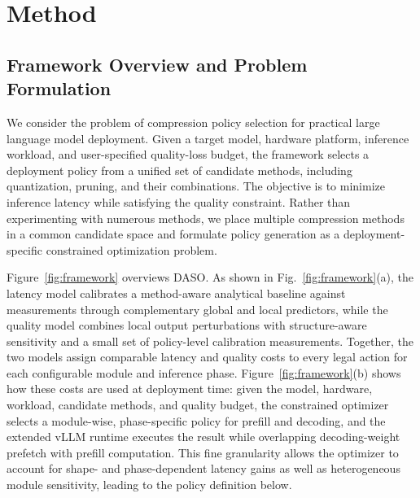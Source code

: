 \documentclass[letterpaper]{article} %
\begin{document}



\section{Method}
\subsection{Framework Overview and Problem Formulation}

We consider the problem of compression policy selection for practical large language model deployment. Given a target model, hardware platform, inference workload, and user-specified quality-loss budget, the framework selects a deployment policy from a unified set of candidate methods, including quantization, pruning, and their combinations. The objective is to minimize inference latency while satisfying the quality constraint. Rather than experimenting with numerous methods, we place multiple compression methods in a common candidate space and formulate policy generation as a deployment-specific constrained optimization problem.

Figure~\ref{fig:framework} overviews DASO. As shown in Fig.~\ref{fig:framework}(a), the latency model calibrates a method-aware analytical baseline against measurements through complementary global and local predictors, while the quality model combines local output perturbations with structure-aware sensitivity and a small set of policy-level calibration measurements. Together, the two models assign comparable latency and quality costs to every legal action for each configurable module and inference phase. Figure~\ref{fig:framework}(b) shows how these costs are used at deployment time: given the model, hardware, workload, candidate methods, and quality budget, the constrained optimizer selects a module-wise, phase-specific policy for prefill and decoding, and the extended vLLM runtime executes the result while overlapping decoding-weight prefetch with prefill computation. This fine granularity allows the optimizer to account for shape- and phase-dependent latency gains as well as heterogeneous module sensitivity, leading to the policy definition below.
\end{document}
